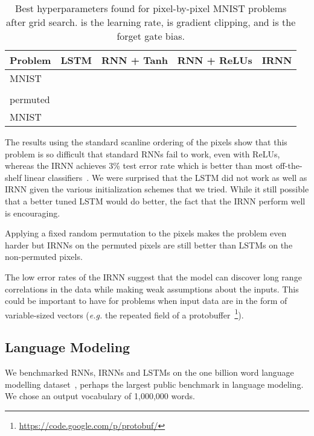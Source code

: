 \documentclass{article} \usepackage{nips14submit_e,times,graphicx}
\begin{document}
\begin{table}[h!]
\begin{small}
\centering
\begin{tabular}{|l|l|l|l|l|}
\hline
{\bf Problem}       &  {\bf LSTM} & {\bf RNN + Tanh} & {\bf RNN + ReLUs} & {\bf IRNN} \\\hline \hline
MNIST               &   &  &  &        \\
                    &          &                    &                    &                         \\\hline                    
permuted       &   &  &   &        \\
MNIST                    &          &                    &                    &                         \\\hline
\end{tabular}
\caption{Best hyperparameters found for pixel-by-pixel MNIST problems after grid
  search.  is the learning rate,  is gradient clipping, and
   is the forget gate bias.}
\label{tab:mnist-problem-hyp}
\end{small}
\end{table}

The results using the standard scanline ordering of the pixels show
that this problem is so difficult that standard RNNs fail to work,
even with ReLUs, whereas the IRNN achieves 3\% test error rate which
is better than most off-the-shelf linear
classifiers~\cite{lecun98}. We were surprised that the LSTM did not
work as well as IRNN given the various initialization schemes that we
tried. While it still possible that a better tuned LSTM would do
better, the fact that the IRNN perform well is encouraging.

Applying a fixed random permutation to the pixels makes the problem
even harder but IRNNs on the permuted pixels are still better
than LSTMs on the non-permuted pixels.

The low error rates of the IRNN suggest that the model can discover
long range correlations in the data while making weak assumptions
about the inputs. This could be important to have for problems when
input data are in the form of variable-sized vectors ({\it e.g.}  the
repeated field of a
protobuffer~\footnote{\url{https://code.google.com/p/protobuf/}}).


\subsection{Language Modeling}
We benchmarked RNNs, IRNNs and LSTMs on the one billion word language
modelling dataset~\cite{DBLP:journals/corr/ChelbaMSGBK13}, perhaps the
largest public benchmark in language modeling. We chose an output
vocabulary of 1,000,000 words.
\end{document}
